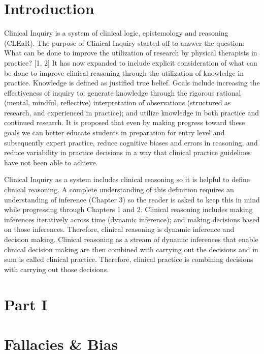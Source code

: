 \documentclass[
]{book}
\begin{document}
\hypertarget{intro}{%
\chapter*{Introduction}\label{intro}}

Clinical Inquiry is a system of clinical logic, epistemology and reasoning (CLEaR). The purpose of Clinical Inquiry started off to answer the question: What can be done to improve the utilization of research by physical therapists in practice? {[}1, 2{]} It has now expanded to include explicit consideration of what can be done to improve clinical reasoning through the utilization of knowledge in practice. Knowledge is defined as justified true belief. Goals include increasing the effectiveness of inquiry to: generate knowledge through the rigorous rational (mental, mindful, reflective) interpretation of observations (structured as research, and experienced in practice); and utilize knowledge in both practice and continued research. It is proposed that even by making progress toward these goals we can better educate students in preparation for entry level and subsequently expert practice, reduce cognitive biases and errors in reasoning, and reduce variability in practice decisions in a way that clinical practice guidelines have not been able to achieve.

Clinical Inquiry as a system includes clinical reasoning so it is helpful to define clinical reasoning. A complete understanding of this definition requires an understanding of inference (Chapter 3) so the reader is asked to keep this in mind while progressing through Chapters 1 and 2. Clinical reasoning includes making inferences iteratively across time (dynamic inference); and making decisions based on those inferences. Therefore, clinical reasoning is dynamic inference and decision making. Clinical reasoning as a stream of dynamic inferences that enable clinical decision making are then combined with carrying out the decisions and in sum is called clinical practice. Therefore, clinical practice is combining decisions with carrying out those decisions.

\hypertarget{part1}{%
\chapter*{Part I}\label{part1}}

\hypertarget{fallacies-bias}{%
\chapter{Fallacies \& Bias}\label{fallacies-bias}}
\end{document}
